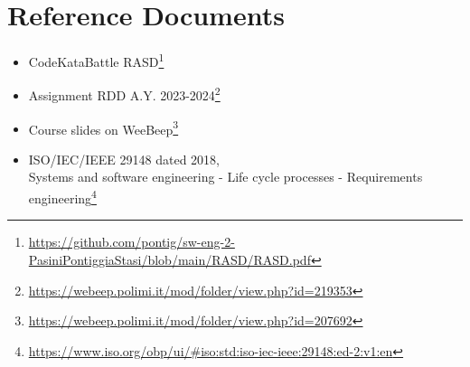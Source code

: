 \section{Reference Documents}
\begin{itemize}
    \item CodeKataBattle RASD\footnote{\url{https://github.com/pontig/sw-eng-2-PasiniPontiggiaStasi/blob/main/RASD/RASD.pdf}}
    \item Assignment RDD A.Y. 2023-2024\footnote{\url{https://webeep.polimi.it/mod/folder/view.php?id=219353}}
    \item Course slides on WeeBeep\footnote{\url{https://webeep.polimi.it/mod/folder/view.php?id=207692}}
    \item ISO/IEC/IEEE 29148 dated 2018, \\
          Systems and software engineering - Life cycle processes - Requirements engineering\footnote{\url{https://www.iso.org/obp/ui/\#iso:std:iso-iec-ieee:29148:ed-2:v1:en}}
\end{itemize}

\newpage

